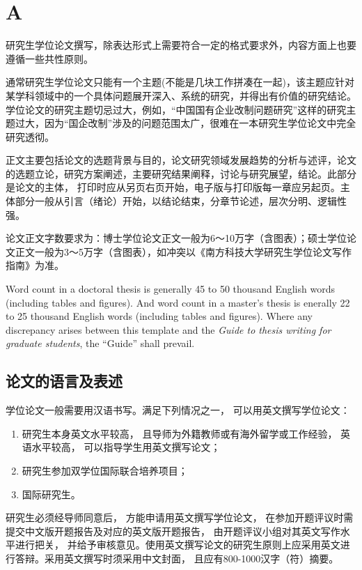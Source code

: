 
\chapter{A}

研究生学位论文撰写，除表达形式上需要符合一定的格式要求外，内容方面上也要遵循一些共性原则。

通常研究生学位论文只能有一个主题(不能是几块工作拼凑在一起)，该主题应针对某学科领域中的一个具体问题展开深入、系统的研究，并得出有价值的研究结论。
学位论文的研究主题切忌过大，例如，“中国国有企业改制问题研究”这样的研究主题过大，因为“国企改制”涉及的问题范围太广，很难在一本研究生学位论文中完全研究透彻。

正文主要包括论文的选题背景与目的，论文研究领域发展趋势的分析与述评，论文的选题立论，研究方案阐述，主要研究结果阐释，讨论与研究展望，结论。此部分是论文的主体， 打印时应从另页右页开始，电子版与打印版每一章应另起页。主体部分一般从引言（绪论）开始，以结论结束，分章节论述，层次分明、逻辑性强。

论文正文字数要求为：博士学位论文正文一般为6～10万字（含图表）；硕士学位论文正文一般为3～5万字（含图表），如冲突以《南方科技大学研究生学位论文写作指南》为准。

Word count in a doctoral thesis is generally 45 to 50 thousand English words (including tables and figures). And word count in a master's thesis is enerally 22 to 25 thousand English words (including tables and figures). Where any discrepancy arises between this template and the \textit{Guide to thesis writing for graduate students}, the ``Guide'' shall prevail.


\section{论文的语言及表述}

学位论文一般需要用汉语书写。满足下列情况之一， 可以用英文撰写学位论文：

\begin{enumerate}
\item 研究生本身英文水平较高， 且导师为外籍教师或有海外留学或工作经验， 英语水平较高， 可以指导学生用英文撰写论文；
\item 研究生参加双学位国际联合培养项目；
\item 国际研究生。
\end{enumerate}

研究生必须经导师同意后， 方能申请用英文撰写学位论文， 在参加开题评议时需提交中文版开题报告及对应的英文版开题报告， 由开题评议小组对其英文写作水平进行把关， 并给予审核意见。使用英文撰写论文的研究生原则上应采用英文进行答辩。采用英文撰写时须采用中文封面， 且应有800-1000汉字（符）摘要。

